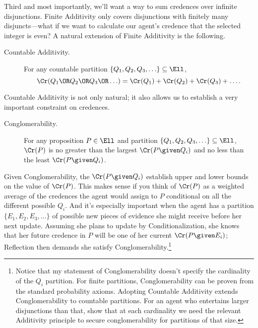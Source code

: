 Third and most importantly, we'll want a way to sum credences over infinite disjunctions. Finite Additivity only covers disjunctions with finitely many disjuncts---what if we want to calculate our agent's credence that the selected integer is even? A natural extension of Finite Additivity is the following.
\begin{description}
\item[Countable Additivity.\,]{For any countable partition $\{Q_1, Q_2, Q_3, \ldots\} \subseteq \Ell$,
\begin{equation*}
\Cr(Q_1 \OR Q_2 \OR Q_3 \OR \ldots)=\Cr(Q_1)+\Cr(Q_2)+\Cr(Q_3)+\ldots.
\end{equation*}}
\end{description}
Countable Additivity is not only natural; it also allows us to establish a very important constraint on credences.
\begin{description}
\item[Conglomerability.\,]{For any proposition $P \in \Ell$ and partition $\{Q_1, Q_2, \allowbreak Q_3, \ldots\} \subseteq \Ell$, $\Cr(P)$ is no greater than the largest $\Cr(P \given Q_i)$ and no less than the least $\Cr(P \given Q_i)$.}
\end{description} 
Given Conglomerability, the $\Cr(P \given Q_i)$ establish upper and lower bounds on the value of $\Cr(P)$. This makes sense if you think of $\Cr(P)$ as a weighted average of the credences the agent would assign to $P$ conditional on all the different possible $Q_i$. And it's especially important when the agent has a partition $\{E_1, E_2, E_3, \ldots\}$ of possible new pieces of evidence she might receive before her next update. Assuming she plans to update by Conditionalization, she knows that her future credence in $P$ will be one of her current $\Cr(P \given E_i)$; Reflection then demands she satisfy Conglomerability.\footnote
{Notice that my statement of Conglomerability doesn't specify the cardinality of the $Q_i$ partition. For finite partitions, Conglomerability can be proven from the standard probability axioms. Adopting Countable Additivity extends Conglomerability to countable partitions. For an agent who entertains larger disjunctions than that, \citet{SeidenfeldNonconglomerability} show that at each cardinality we need the relevant Additivity principle to secure conglomerability for partitions of that size.}

